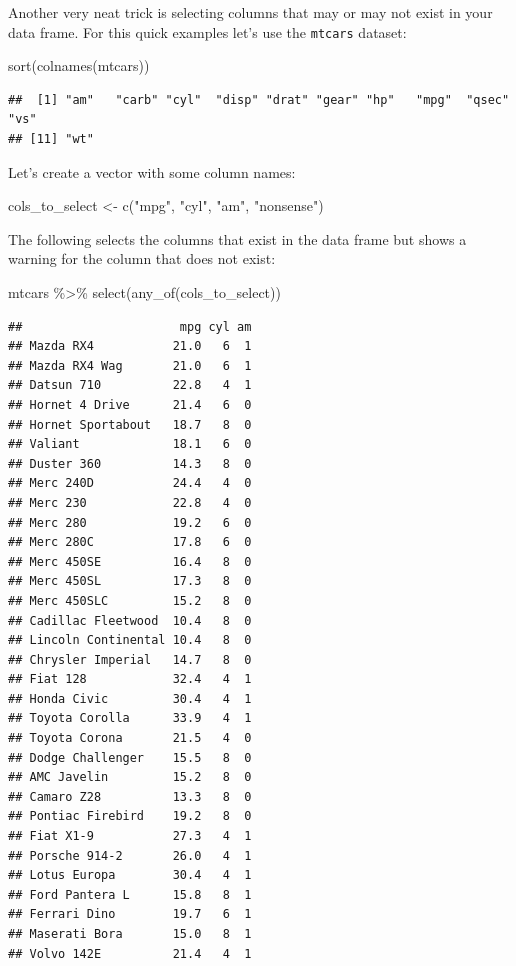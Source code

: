 \documentclass[
]{article}
\newenvironment{Shaded}{\begin{snugshade}}{\end{snugshade}}
\newcommand{\FunctionTok}[1]{\textcolor[rgb]{0.00,0.00,0.00}{#1}}
\newcommand{\NormalTok}[1]{#1}
\newcommand{\OtherTok}[1]{\textcolor[rgb]{0.56,0.35,0.01}{#1}}
\newcommand{\SpecialCharTok}[1]{\textcolor[rgb]{0.00,0.00,0.00}{#1}}
\newcommand{\StringTok}[1]{\textcolor[rgb]{0.31,0.60,0.02}{#1}}
\begin{document}
Another very neat trick is selecting columns that may or may not exist in your data frame. For this quick examples
let's use the \texttt{mtcars} dataset:

\begin{Shaded}
\begin{Highlighting}[]
\FunctionTok{sort}\NormalTok{(}\FunctionTok{colnames}\NormalTok{(mtcars))}
\end{Highlighting}
\end{Shaded}

\begin{verbatim}
##  [1] "am"   "carb" "cyl"  "disp" "drat" "gear" "hp"   "mpg"  "qsec" "vs"  
## [11] "wt"
\end{verbatim}

Let's create a vector with some column names:

\begin{Shaded}
\begin{Highlighting}[]
\NormalTok{cols\_to\_select }\OtherTok{\textless{}{-}} \FunctionTok{c}\NormalTok{(}\StringTok{"mpg"}\NormalTok{, }\StringTok{"cyl"}\NormalTok{, }\StringTok{"am"}\NormalTok{, }\StringTok{"nonsense"}\NormalTok{)}
\end{Highlighting}
\end{Shaded}

The following selects the columns that exist
in the data frame but shows a warning for the column that does not exist:

\begin{Shaded}
\begin{Highlighting}[]
\NormalTok{mtcars }\SpecialCharTok{\%\textgreater{}\%}
  \FunctionTok{select}\NormalTok{(}\FunctionTok{any\_of}\NormalTok{(cols\_to\_select))}
\end{Highlighting}
\end{Shaded}

\begin{verbatim}
##                      mpg cyl am
## Mazda RX4           21.0   6  1
## Mazda RX4 Wag       21.0   6  1
## Datsun 710          22.8   4  1
## Hornet 4 Drive      21.4   6  0
## Hornet Sportabout   18.7   8  0
## Valiant             18.1   6  0
## Duster 360          14.3   8  0
## Merc 240D           24.4   4  0
## Merc 230            22.8   4  0
## Merc 280            19.2   6  0
## Merc 280C           17.8   6  0
## Merc 450SE          16.4   8  0
## Merc 450SL          17.3   8  0
## Merc 450SLC         15.2   8  0
## Cadillac Fleetwood  10.4   8  0
## Lincoln Continental 10.4   8  0
## Chrysler Imperial   14.7   8  0
## Fiat 128            32.4   4  1
## Honda Civic         30.4   4  1
## Toyota Corolla      33.9   4  1
## Toyota Corona       21.5   4  0
## Dodge Challenger    15.5   8  0
## AMC Javelin         15.2   8  0
## Camaro Z28          13.3   8  0
## Pontiac Firebird    19.2   8  0
## Fiat X1-9           27.3   4  1
## Porsche 914-2       26.0   4  1
## Lotus Europa        30.4   4  1
## Ford Pantera L      15.8   8  1
## Ferrari Dino        19.7   6  1
## Maserati Bora       15.0   8  1
## Volvo 142E          21.4   4  1
\end{verbatim}
\end{document}
